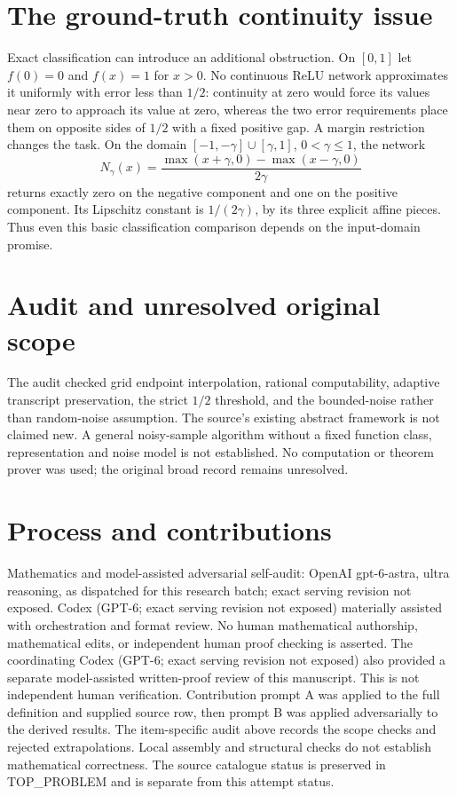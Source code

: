 \documentclass[11pt]{article}
\begin{document}
\section{The ground-truth continuity issue}
Exact classification can introduce an additional obstruction.
On $[0,1]$ let $f(0)=0$ and $f(x)=1$ for $x>0$.
No continuous ReLU network approximates it uniformly with
error less than $1/2$: continuity at zero would force its
values near zero to approach its value at zero, whereas the
two error requirements place them on opposite sides of
$1/2$ with a fixed positive gap.
A margin restriction changes the task. On the domain
$[-1,-\gamma]\cup[\gamma,1]$, $0<\gamma\le1$, the network
\[
 N_\gamma(x)=\frac{\max(x+\gamma,0)-\max(x-\gamma,0)}{2\gamma}
\]
returns exactly zero on the negative component and one on
the positive component. Its Lipschitz constant is $1/(2\gamma)$,
by its three explicit affine pieces. Thus even this basic
classification comparison depends on the input-domain promise.

\section{Audit and unresolved original scope}
The audit checked grid endpoint interpolation, rational
computability, adaptive transcript preservation, the strict
$1/2$ threshold, and the bounded-noise rather than random-noise
assumption. The source's existing abstract framework is not
claimed new. A general noisy-sample algorithm without a fixed
function class, representation and noise model is not established.
No computation or theorem prover was used; the original broad
record remains unresolved.

\section{Process and contributions}
Mathematics and model-assisted adversarial self-audit: OpenAI gpt-6-astra, ultra reasoning, as dispatched for this research batch; exact serving revision not exposed. Codex (GPT-6; exact serving revision not exposed) materially assisted with orchestration and format review. No human mathematical authorship, mathematical edits, or independent human proof checking is asserted.
The coordinating Codex (GPT-6; exact serving revision not exposed) also provided a separate model-assisted written-proof review of this manuscript. This is not independent human verification.
Contribution prompt A was applied to the full definition and supplied source row, then prompt B was applied adversarially to the derived results. The item-specific audit above records the scope checks and rejected extrapolations. Local assembly and structural checks do not establish mathematical correctness. The source catalogue status is preserved in TOP\_PROBLEM and is separate from this attempt status.
\end{document}
